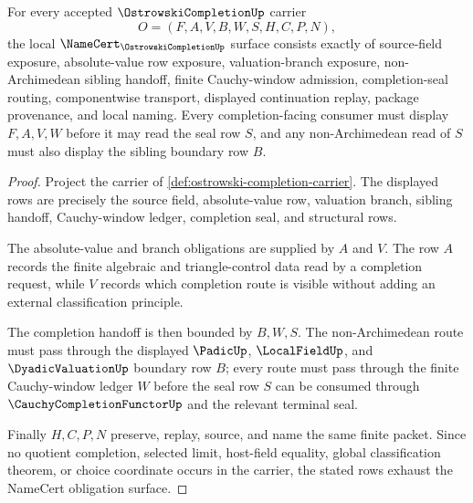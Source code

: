 \begin{theorem}
\label{thm:ostrowski-completion-namecert-obligations}
For every accepted $\OstrowskiCompletionUp$ carrier
$$
O=(F,A,V,B,W,S,H,C,P,N),
$$
the local $\NameCert_{\OstrowskiCompletionUp}$ surface consists exactly of source-field exposure, absolute-value row exposure, valuation-branch exposure, non-Archimedean sibling handoff, finite Cauchy-window admission, completion-seal routing, componentwise transport, displayed continuation replay, package provenance, and local naming. Every completion-facing consumer must display $F,A,V,W$ before it may read the seal row $S$, and any non-Archimedean read of $S$ must also display the sibling boundary row $B$.
\end{theorem}
\begin{proof}
Project the carrier of \autoref{def:ostrowski-completion-carrier}. The displayed rows are precisely the source field, absolute-value row, valuation branch, sibling handoff, Cauchy-window ledger, completion seal, and structural rows.

The absolute-value and branch obligations are supplied by $A$ and $V$. The row $A$ records the finite algebraic and triangle-control data read by a completion request, while $V$ records which completion route is visible without adding an external classification principle.

The completion handoff is then bounded by $B,W,S$. The non-Archimedean route must pass through the displayed $\PadicUp$, $\LocalFieldUp$, and $\DyadicValuationUp$ boundary row $B$; every route must pass through the finite Cauchy-window ledger $W$ before the seal row $S$ can be consumed through $\CauchyCompletionFunctorUp$ and the relevant terminal seal.

Finally $H,C,P,N$ preserve, replay, source, and name the same finite packet. Since no quotient completion, selected limit, host-field equality, global classification theorem, or choice coordinate occurs in the carrier, the stated rows exhaust the NameCert obligation surface.
\end{proof}


